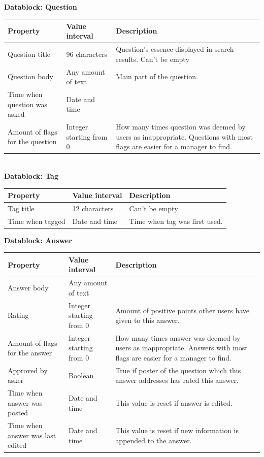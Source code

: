 \documentclass[a4paper,12pt]{article}
\begin{document}
\hspace*{\fill}\\
\textbf{Datablock: Question}
\begin{center}
    \begin{tabular}{ | p{4cm} | p{3cm} | p{5cm} |}
    \hline
    Property & Value interval & Description \\ \hline
    Question title & 96 characters & Question's essence displayed in search results. Can't be empty \\ \hline
    Question body & Any amount of text & Main part of the question. \\ \hline
    Time when question was asked & Date and time &  \\
    \hline
    Amount of flags for the question & Integer starting from 0 & How many times question was deemed by users as inappropriate. Questions with most flags are easier for a manager to find. \\
    \hline
    \end{tabular}
\end{center}
\hspace*{\fill}\\
\textbf{Datablock: Tag}
\begin{center}
    \begin{tabular}{ | p{4cm} | p{3cm} | p{5cm} |}
    \hline
    Property & Value interval & Description \\ \hline
    Tag title & 12 characters & Can't be empty \\ \hline
    Time when tagged & Date and time & Time when tag was first used. \\ \hline
    \end{tabular}
\end{center}
\newpage
\textbf{Datablock: Answer}
\begin{center}
    \begin{tabular}{ | p{4cm} | p{3cm} | p{5cm} |}
    \hline
    Property & Value interval & Description \\ \hline
    Answer body & Any amount of text &  \\ \hline
    Rating & Integer starting from 0 & Amount of positive points other users have given to this answer. \\ \hline
    Amount of flags for the answer & Integer starting from 0 & How many times answer was deemed by users as inappropriate. Answers with most flags are easier for a manager to find. \\
    \hline
    Approved by asker & Boolean & True if poster of the question which this answer addresses has rated this answer. \\
    \hline
    Time when answer was posted & Date and time & This value is reset if answer is edited. \\
    \hline
    Time when answer was last edited & Date and time & This value is reset if new information is appended to the answer. \\
    \hline
    \end{tabular}
\end{center}
\end{document}
